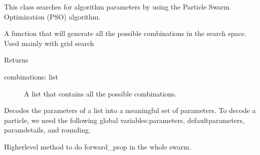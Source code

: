 \documentclass[letterpaper,10pt,english]{sphinxmanual}
\begin{document}
\begin{fulllineitems}
\label{\detokenize{index:pspso.pspso}}
This class searches for algorithm parameters by using the Particle Swarm Optimization (PSO) algorithm.

\begin{fulllineitems}
\label{\detokenize{index:pspso.pspso.calculatecombinations}}
A function that will generate all the possible combinations in the search space.
Used mainly with grid search

Returns
\begin{description}
\item[{combinations: list}] \leavevmode
A list that contains all the possible combinations.

\end{description}

\end{fulllineitems}


\begin{fulllineitems}
\label{\detokenize{index:pspso.pspso.decode_parameters}}
Decodes the parameters of a list into a meaningful set of parameters.
To decode a particle, we need the following global variables:parameters,
defaultparameters, paramdetails, and rounding.

\end{fulllineitems}


\begin{fulllineitems}
\label{\detokenize{index:pspso.pspso.f}}
Higher\sphinxhyphen{}level method to do forward\_prop in the
whole swarm.


\end{fulllineitems}
\end{fulllineitems}
\end{document}
